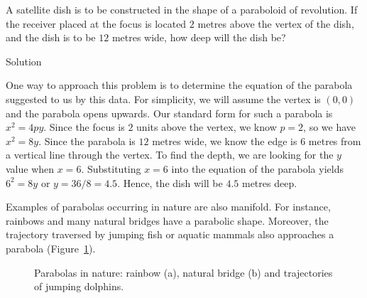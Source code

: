 \begin{example} 
A satellite dish is to be constructed in the shape of a paraboloid of revolution.  If the receiver placed at the focus is located $2$ metres above the vertex of the dish, and the dish is to be $12$ metres wide, how deep will the dish be?

Solution 

  One way to approach this problem is to determine the equation of the parabola suggested to us by this data.  For simplicity, we will assume the vertex is $(0,0)$ and the parabola opens upwards.  Our standard form for such a parabola is $x^2 = 4py$.  Since the focus is $2$ units above the vertex, we know  $p=2$, so we have $x^2 = 8y$.  Since the parabola is $12$ metres wide, we know the edge is $6$ metres from a vertical line through the vertex.  To find the depth, we are looking for the $y$ value when $x=6$.  Substituting $x=6$ into the equation of the parabola yields $6^2 = 8y$ or $y = 36/8 = 4.5$.  Hence, the dish will be  $4.5$ metres deep.  

\end{example}

Examples of parabolas occurring in nature are also manifold. For instance, rainbows and many natural bridges have a parabolic shape. Moreover, the trajectory traversed by jumping fish or aquatic mammals also approaches a parabola (Figure~\ref{fig_algebraic_31}). 


\begin{figure}[h]
\centering
\centerline{
\hspace{0.1cm}
\hspace{0.1cm}
}
\caption{Parabolas in nature: rainbow (a), natural bridge (b) and trajectories of jumping dolphins. \label{fig_algebraic_31}}
\end{figure}
\fi



